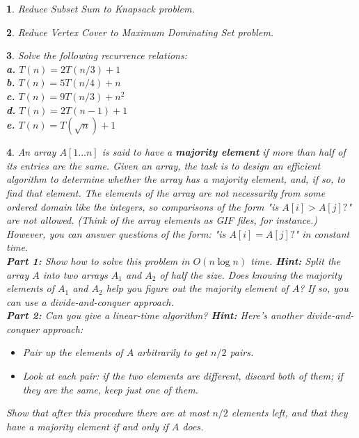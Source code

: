 \documentclass[%
addpoints]{exam}
\theoremstyle{problem}
\newtheorem{p}{}
\begin{document}
\begin{p}
Reduce Subset Sum to Knapsack problem.
\hfill \end{p}

\begin{p}
Reduce Vertex Cover to Maximum Dominating Set problem.
\hfill \end{p}

\begin{p}
Solve the following recurrence relations:\\
\vspace{10pt}
\textbf{a.} \( T(n) = 2T(n/3) + 1 \)\\
\textbf{b.} \( T(n) = 5T(n/4) + n \)\\
\textbf{c.} \( T(n) = 9T(n/3) + n^2 \)\\
\textbf{d.} \( T(n) = 2T(n-1) + 1 \)\\
\textbf{e.} \( T(n) = T(\sqrt{n}) + 1 \)\\
\hfill \end{p}

\begin{p}
An array \( A[1 \dots n] \) is said to have a \textbf{majority element} if more than half of its entries are the same. Given an array, the task is to design an efficient algorithm to determine whether the array has a majority element, and, if so, to find that element. The elements of the array are not necessarily from some ordered domain like the integers, so comparisons of the form "is \( A[i] > A[j]? \)" are not allowed. (Think of the array elements as GIF files, for instance.) However, you can answer questions of the form: "is \( A[i] = A[j]? \)" in constant time.\\
\vspace{10pt}
\textbf{Part 1:} Show how to solve this problem in \( O(n \log n) \) time. 
\textbf{Hint:} Split the array \( A \) into two arrays \( A_1 \) and \( A_2 \) of half the size. Does knowing the majority elements of \( A_1 \) and \( A_2 \) help you figure out the majority element of \( A \)? If so, you can use a \textit{divide-and-conquer} approach.\\
\vspace{10pt}
\textbf{Part 2:} Can you give a linear-time algorithm? 
\textbf{Hint:} Here's another \textit{divide-and-conquer} approach:
\begin{itemize}
    \item Pair up the elements of \( A \) arbitrarily to get \( n/2 \) pairs.
    \item Look at each pair: if the two elements are different, discard both of them; if they are the same, keep just one of them.
\end{itemize}
Show that after this procedure there are at most \( n/2 \) elements left, and that they have a majority element if and only if \( A \) does.
\hfill \end{p}
\end{document}

